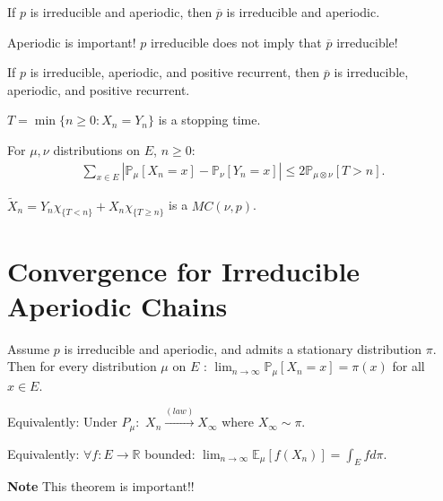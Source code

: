 \begin{prop}[]
	If $p$ is irreducible and aperiodic, then $\overline{p}$ is irreducible and aperiodic.
\end{prop}

\begin{rmk}[]
	Aperiodic is important!  $p$ irreducible does not imply that $\overline{p}$ irreducible!
\end{rmk}

\begin{prop}[]
	If $p$ is irreducible, aperiodic, and positive recurrent, then $\overline{p}$ is irreducible, aperiodic, and positive recurrent.
\end{prop}

\begin{defn}
	$T=\min\{n\geq 0: X_n=Y_n\}$ is a stopping time.
\end{defn}

\begin{prop}[]
	For $\mu, \nu $ distributions on $E$, $n\geq 0$: 
\begin{align}
\sum_{x \in E}^{} |\mathbb{P}_{\mu } \left[ X_n=x \right] - \mathbb{P}_{\nu} \left[Y_n=x  \right] | \leq 2 \mathbb{P}_{\mu \otimes \nu } \left[ T>n \right]
.\end{align}
\end{prop}

\begin{lemma}[]
	$\tilde{X}_n = Y_n\chi_{\{T<n\}} + X_n \chi_{\{T \geq n\}} $ is a $MC(\nu, p)$.
\end{lemma}

\section{Convergence for Irreducible Aperiodic Chains}
\begin{theorem}[]
	Assume $p$ is irreducible and aperiodic, and admits a stationary distribution $\pi $. Then for every distribution $\mu$ on $E$ : $\lim_{n \to \infty}\mathbb{P}_{\mu } \left[ X_n=x \right] = \pi(x)$ for all $x \in E$. 

	\noindent
	Equivalently: Under $P_\mu: $ $X_n \stackrel{(law)}{\to} X_\infty$ where $X_\infty \sim \pi$. 

	\noindent
	Equivalently: $\forall f:E \to \mathbb{R}$ bounded: $\lim_{n \to \infty} \mathbb{E}_{\mu } \left[ f(X_n) \right] = \int_{E}^{} f d \pi$.
\end{theorem}
\textbf{Note} This theorem is important!! 

